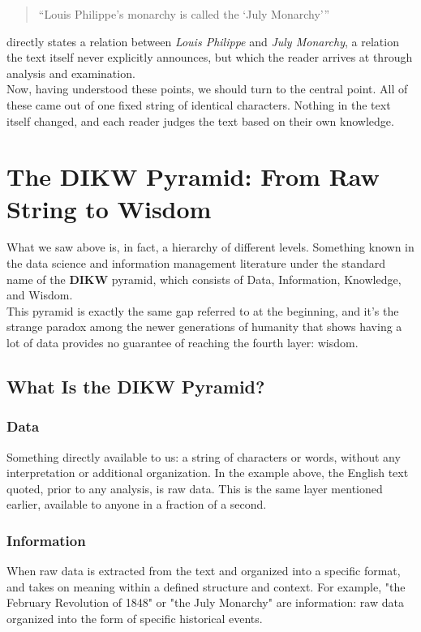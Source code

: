 \begin{quote}
``Louis Philippe's monarchy is called the `July Monarchy'''
\end{quote}
directly states a relation between \textit{Louis Philippe} and \textit{July Monarchy}, a relation the text itself never explicitly announces, but which the reader arrives at through analysis and examination.\\
Now, having understood these points, we should turn to the central point. All of these came out of one fixed string of identical characters. Nothing in the text itself changed, and each reader judges the text based on their own knowledge.\\
\section{The DIKW Pyramid: From Raw String to Wisdom}
\label{sec:levels-of-data}

What we saw above is, in fact, a hierarchy of different levels. Something known in the data science and information management literature under the standard name of the \textbf{DIKW} pyramid, which consists of Data, Information, Knowledge, and Wisdom.\\
This pyramid is exactly the same gap referred to at the beginning, and it's the strange paradox among the newer generations of humanity that shows having a lot of data provides no guarantee of reaching the fourth layer: wisdom.

\subsection{What Is the DIKW Pyramid?}
\label{sub:what-is-dikw}

\subsubsection{Data}
Something directly available to us: a string of characters or words, without any interpretation or additional organization. In the example above, the English text quoted, prior to any analysis, is raw data. This is the same layer mentioned earlier, available to anyone in a fraction of a second.

\subsubsection{Information}
When raw data is extracted from the text and organized into a specific format, and takes on meaning within a defined structure and context. For example, "the February Revolution of 1848" or "the July Monarchy" are information: raw data organized into the form of specific historical events.

